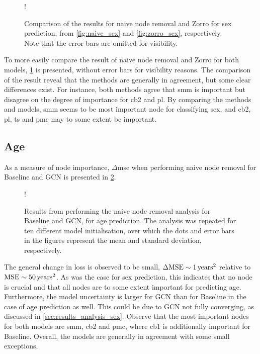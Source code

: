 \begin{figure}[H]
    \centering
    \begin{center}
    \resizebox {0.7\linewidth} {!} {
        
    }
    \end{center}
    \caption{Comparison of the results for naive node removal and Zorro for sex prediction, from \cref{fig:naive_sex} and \cref{fig:zorro_sex}, respectively. Note that the error bars are omitted for visibility.}
    \label{fig:comparison_sex}
\end{figure}

To more easily compare the result of naive node removal and Zorro for both models, \cref{fig:comparison_sex} is presented, without error bars for visibility reasons. The comparison of the result reveal that the methods are generally in agreement, but some clear differences exist. For instance, both methods agree that \acrshort{smm} is important but disagree on the degree of importance for \acrshort{cb2} and \acrshort{pl}. By comparing the methods and models, \acrshort{smm} seems to be most important node for classifying sex, and \acrshort{cb2}, \acrshort{pl}, \acrshort{ts} and \acrshort{pmc} may to some extent be important.

\subsection{Age}

As a measure of node importance, $\Delta$\acrshort{mse} when performing naive node removal for Baseline and GCN is presented in \cref{fig:naive_age}. 

\begin{figure}[!htbp]
    \centering
    \begin{center}
        \resizebox {0.7\linewidth} {!} {
            
        }
    \end{center}
    \caption{Results from performing the naive node removal analysis for Baseline and GCN, for age prediction. The analysis was repeated for ten different model initialisation, over which the dots and error bars in the figures represent the mean and standard deviation, respectively.}
    \label{fig:naive_age}
\end{figure}

The general change in loss is observed to be small, $\Delta\text{MSE}\sim1\rm\,years^2$ relative to $\text{MSE}\sim50\rm\,years^2$. As was the case for sex prediction, this indicates that no node is crucial and that all nodes are to some extent important for predicting age. Furthermore, the model uncertainty is larger for GCN than for Baseline in the case of age prediction as well. This could be due to GCN not fully converging, as discussed in \cref{sec:results_analysis_sex}. Observe that the most important nodes for both models are \acrshort{smm}, \acrshort{cb2} and \acrshort{pmc}, where \acrshort{cb1} is additionally important for Baseline. Overall, the models are generally in agreement with some small exceptions. 

